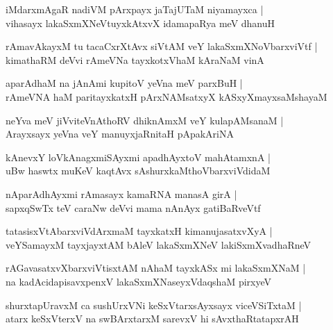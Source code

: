 \begin{shloka}
iMdarxmAgaR nadiVM pArxpayx jaTajUTaM niyamayxca |\\
vihasayx lakaSxmXNeVtuyxkAtxvX idamapaRya meV dhanuH 
\end{shloka}

\begin{shloka}
rAmavAkayxM tu tacaCxrXtAvx siVtAM veY lakaSxmXNoVbarxviVtf |\\
kimathaRM deVvi rAmeVNa tayxkotxVhaM kAraNaM vinA
\end{shloka}

\begin{shloka}
aparAdhaM na jAnAmi kupitoV yeVna meV parxBuH |\\
rAmeVNA haM paritayxkatxH pArxNAMsatxyX kASxyXmayxsaMshayaM
\end{shloka}

\begin{shloka}
neYva meV jiVviteVnAthoRV dhiknAmxM veY kulapAMsanaM |\\
Arayxsayx yeVna veY manuyxjaRnitaH pApakAriNA
\end{shloka}

\begin{shloka}
kAnevxY loVkAnagxmiSAyxmi apadhAyxtoV mahAtamxnA |\\
uBw haswtx muKeV kaqtAvx sAshurxkaMthoVbarxviVdidaM 
\end{shloka}

\begin{shloka}
nAparAdhAyxmi rAmasayx kamaRNA manasA girA |\\
sapxqSwTx teV caraNw deVvi mama nAnAyx gatiBaRveVtf
\end{shloka}

\begin{shloka}
tatasisxVtAbarxviVdArxmaM tayxkatxH kimanujasatxvXyA |\\
veYSamayxM tayxjayxtAM bAleV lakaSxmXNeV lakiSxmXvadhaRneV 
\end{shloka}

\begin{shloka}
rAGavasatxvXbarxviVtisxtAM nAhaM tayxkASx mi lakaSxmXNaM |\\
na kadAcidapisavxpenxV lakaSxmXNaseyxVdaqshaM pirxyeV 
\end{shloka}

\begin{shloka}
shurxtapUravxM ca sushUrxVNi keSxVtarxsAyxsayx viceVSiTxtaM |\\
atarx keSxVterxV na swBArxtarxM sarevxV hi sAvxthaRtatapxrAH 
\end{shloka}

